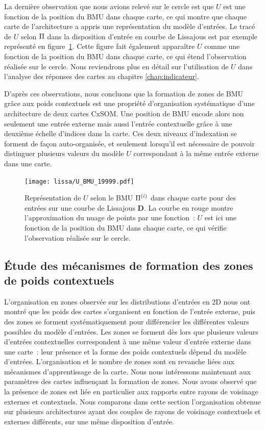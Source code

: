 \documentclass[../main]{subfiles}
\begin{document}
La dernière observation que nous avions relevé sur le cercle est que $U$ est une fonction de la position du BMU dans chaque carte, ce qui montre que chaque carte de l'architecture a appris une représentation du modèle d'entrées. Le tracé de $U$ selon $\Pi$ dans la disposition d'entrée en courbe de Lissajous est par exemple représenté en figure~\ref{fig:u_bmu_lissa}. 
Cette figure fait également apparaître $U$ comme une fonction de la position du BMU dans chaque carte, ce qui étend l'observation réalisée sur le cercle.
Nous reviendrons plus en détail sur l'utilisation de $U$ dans l'analyse des réponses des cartes au chapitre \ref{chap:indicateur}.

D'après ces observations, nous concluons que la formation de zones de BMU grâce aux poids contextuels est une propriété d'organisation systématique d'une architecture de deux cartes CxSOM. Une position de BMU encode alors non seulement une entrée externe mais aussi l'entrée contextuelle grâce à une deuxième échelle d'indices dans la carte. Ces deux niveaux d'indexation se forment de façon auto-organisée, et seulement lorsqu'il est nécessaire de pouvoir distinguer plusieurs valeurs du modèle $U$ correspondant à la même entrée externe dans une carte.


\begin{figure}[t]
	\centering\texttt{[image: lissa/U\_BMU\_19999.pdf]}
	\caption{Représentation de $U$ selon le BMU $\Pi^{({i})}$ dans chaque carte pour des entrées sur une courbe de Lissajous \textbf{D}. La courbe en rouge montre l'approximation du nuage de points par une fonction~: $U$ est ici une fonction de la position du BMU dans chaque carte, ce qui vérifie l'observation réalisée sur le cercle.\label{fig:u_bmu_lissa}}
\end{figure}

\subsection{\'Etude des mécanismes de formation des zones de poids contextuels}

L'organisation en zones observée sur les distributions d'entrées en 2D nous ont montré que les poids des cartes s'organisent en fonction de l'entrée externe, puis des zones se forment systématiquement pour différencier les différentes valeurs possibles du modèle d'entrées. Les zones se forment dès lors que plusieurs valeurs d'entrées contextuelles correspondent à une même valeur d'entrée externe dans une carte~: leur présence et la forme des poids contextuels dépend du modèle d'entrées.
L'organisation et le nombre de zones sont en revanche liées aux mécanismes d'apprentissage de la carte.
Nous nous intéressons maintenant aux paramètres des cartes influençant la formation de zones.
Nous avons observé que la présence de zones est liée en particulier aux rapports entre rayons de voisinage externes et contextuels.
Nous comparons dans cette section l'organisation obtenue sur plusieurs architectures ayant des couples de rayons de voisinage contextuels et externes différents, sur une même disposition d'entrée.
\end{document}
